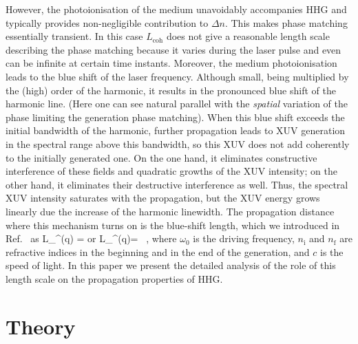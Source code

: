 However, the photoionisation of the medium unavoidably accompanies HHG and typically provides non-negligible contribution to $\Delta n$. This makes phase matching essentially transient. In this case $L_\mathrm{coh}$ does not give a reasonable length scale describing the phase matching because it varies during the laser pulse and even can be infinite at certain time instants. Moreover, the medium photoionisation leads to the blue shift of the laser frequency. Although small, being multiplied by the (high) order of the harmonic, it results in the pronounced blue shift of the harmonic line. (Here one can see natural parallel with the {\it spatial} variation of the phase limiting the generation phase matching). When this blue shift exceeds the initial bandwidth of the harmonic, further propagation leads to XUV generation in the spectral range above this bandwidth, so this XUV does not add coherently to the initially generated one. On the one hand, it eliminates constructive interference of these fields and quadratic growths of the XUV intensity; on the other hand, it eliminates their destructive interference as well. Thus, the spectral XUV intensity saturates with the propagation, but the XUV energy grows linearly due the increase of the harmonic linewidth. The propagation distance where this mechanism turns on is the blue-shift length, which we introduced in Ref.~\cite{KhokhlovaStrelkov} as
L_^{(q)} =  \; \; \; \textrm{or} \; \; \; L_^{(q)}=  \, ,
\eeq
where $\omega_0$ is the driving frequency, $n_\mathrm{i}$ and $n_\mathrm{f}$ are refractive indices in the beginning and in the end of the generation, and $c$ is the speed of light. 
In this paper we present the detailed analysis of the role of this length scale on the propagation properties of HHG.


%
\section{Theory}
%
